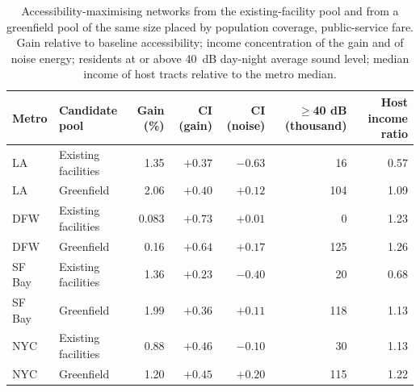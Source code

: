 \begin{table}[!htbp]
\centering
\caption{Accessibility-maximising networks from the existing-facility pool and from a greenfield pool of the same size placed by population coverage, public-service fare. Gain relative to baseline accessibility; income concentration of the gain and of noise energy; residents at or above 40~dB day-night average sound level; median income of host tracts relative to the metro median.}
\label{tab:greenfield}
\footnotesize
\begin{tabular}{llrrrrr}
\toprule
Metro & Candidate pool & Gain (\%) & CI (gain) & CI (noise) & $\geq$40 dB (thousand) & Host income ratio \\
\midrule
LA & Existing facilities & 1.35 & $+0.37$ & $-0.63$ & 16 & 0.57 \\
LA & Greenfield & 2.06 & $+0.40$ & $+0.12$ & 104 & 1.09 \\
DFW & Existing facilities & 0.083 & $+0.73$ & $+0.01$ & 0 & 1.23 \\
DFW & Greenfield & 0.16 & $+0.64$ & $+0.17$ & 125 & 1.26 \\
SF Bay & Existing facilities & 1.36 & $+0.23$ & $-0.40$ & 20 & 0.68 \\
SF Bay & Greenfield & 1.99 & $+0.36$ & $+0.11$ & 118 & 1.13 \\
NYC & Existing facilities & 0.88 & $+0.46$ & $-0.10$ & 30 & 1.13 \\
NYC & Greenfield & 1.20 & $+0.45$ & $+0.20$ & 115 & 1.22 \\
\bottomrule
\end{tabular}
\end{table}
